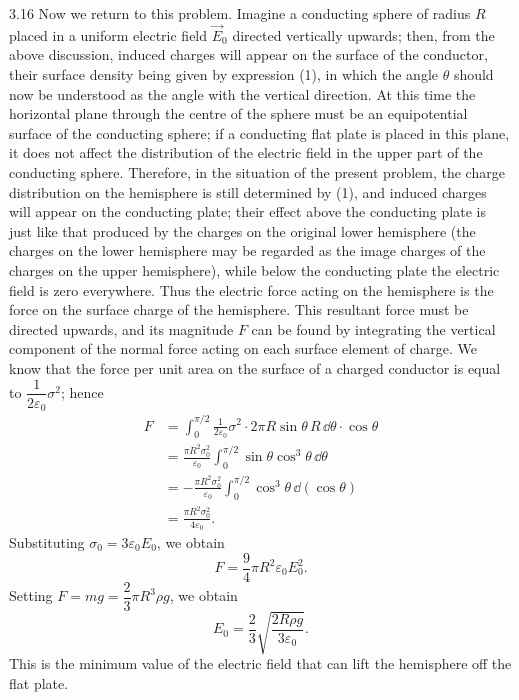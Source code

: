 \begin{solution}{3.16}
Now we return to this problem. Imagine a conducting sphere of radius $R$ placed in a uniform electric field $\vec{E}_0$ directed vertically upwards; then, from the above discussion, induced charges will appear on the surface of the conductor, their surface density being given by expression (1), in which the angle $\theta$ should now be understood as the angle with the vertical direction. At this time the horizontal plane through the centre of the sphere must be an equipotential surface of the conducting sphere; if a conducting flat plate is placed in this plane, it does not affect the distribution of the electric field in the upper part of the conducting sphere. Therefore, in the situation of the present problem, the charge distribution on the hemisphere is still determined by (1), and induced charges will appear on the conducting plate; their effect above the conducting plate is just like that produced by the charges on the original lower hemisphere (the charges on the lower hemisphere may be regarded as the image charges of the charges on the upper hemisphere), while below the conducting plate the electric field is zero everywhere. Thus the electric force acting on the hemisphere is the force on the surface charge of the hemisphere. This resultant force must be directed upwards, and its magnitude $F$ can be found by integrating the vertical component of the normal force acting on each surface element of charge. We know that the force per unit area on the surface of a charged conductor is equal to $\dfrac{1}{2\varepsilon_0}\sigma^2$; hence
\begin{align*}
F&=\int_0^{\pi/2}\frac{1}{2\varepsilon_0}\sigma^2\cdot2\pi R\sin\theta\,R\,\dd\theta\cdot\cos\theta\\
&=\frac{\pi R^2\sigma_0^2}{\varepsilon_0}\int_0^{\pi/2}\sin\theta\cos^3\theta\,\dd\theta\\
&=-\frac{\pi R^2\sigma_0^2}{\varepsilon_0}\int_0^{\pi/2}\cos^3\theta\,\dd(\cos\theta)\\
&=\frac{\pi R^2\sigma_0^2}{4\varepsilon_0}.
\end{align*}
Substituting $\sigma_0=3\varepsilon_0E_0$, we obtain
\begin{equation}
F=\frac{9}{4}\pi R^2\varepsilon_0E_0^2. \tag{2}
\end{equation}
Setting $F=mg=\dfrac{2}{3}\pi R^3\rho g$, we obtain
\[
E_0=\frac{2}{3}\sqrt{\frac{2R\rho g}{3\varepsilon_0}}.
\]
This is the minimum value of the electric field that can lift the hemisphere off the flat plate.
\end{solution}


